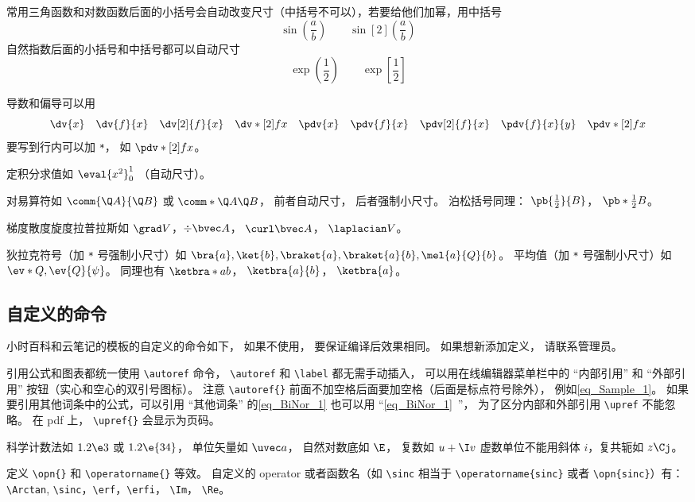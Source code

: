 常用三角函数和对数函数后面的小括号会自动改变尺寸（中括号不可以），若要给他们加幂，用中括号
\begin{equation}
\sin(\frac ab) \qquad \sin[2](\frac ab)
\end{equation}
自然指数后面的小括号和中括号都可以自动尺寸
\begin{equation}
\exp(\frac12) \qquad \exp[\frac12]
\end{equation}

导数和偏导可以用
\begin{equation}
\dv{x} \quad \dv{f}{x} \quad \dv[2]{f}{x} \quad \dv*[2]{f}{x} \quad
\pdv{x} \quad \pdv{f}{x} \quad \pdv[2]{f}{x} \quad \pdv{f}{x}{y} \quad \pdv*[2]{f}{x}
\end{equation}
要写到行内可以加 \verb|*|， 如 $\pdv*[2]{f}{x}$。

定积分求值如 $\eval{x^2}_0^1$ （自动尺寸）。

对易算符如 $\comm{\Q A}{\Q B}$ 或 $\comm*{\Q A}{\Q B}$， 前者自动尺寸， 后者强制小尺寸。 泊松括号同理： $\pb{\frac12}{B}$， $\pb*{\frac12}{B}$。

梯度散度旋度拉普拉斯如 $\grad V$，$\div\bvec A$， $\curl\bvec A$， $\laplacian V$。

狄拉克符号（加 \verb|*| 号强制小尺寸）如 $\bra{a}, \ket{b}, \braket{a}, \braket{a}{b}, \mel{a}{Q}{b}$。 平均值（加 \verb|*| 号强制小尺寸）如 $\ev*{Q}, \ev{Q}{\psi}$。 同理也有 $\ketbra*{a}{b}$， $\ketbra{a}{b}$， $\ketbra{a}$。


\subsection{自定义的命令}
小时百科和云笔记的模板的自定义的命令如下， 如果不使用， 要保证编译后效果相同。 如果想新添加定义， 请联系管理员。

引用公式和图表都统一使用 \verb|\autoref| 命令， \verb|\autoref| 和 \verb|\label| 都无需手动插入， 可以用在线编辑器菜单栏中的 “内部引用” 和 “外部引用” 按钮（实心和空心的双引号图标）。 注意 \verb|\autoref{}| 前面不加空格后面要加空格（后面是标点符号除外）， 例如\autoref{eq_Sample_1}。 如果要引用其他词条中的公式，可以引用 “其他词条” 的\autoref{eq_BiNor_1} 也可以用 “\autoref{eq_BiNor_1}~”， 为了区分内部和外部引用 \verb|\upref| 不能忽略。 在 pdf 上， \verb|\upref{}| 会显示为页码。

科学计数法如 $1.2\e3$ 或 $1.2\e{34}$， 单位矢量如 $\uvec a$， 自然对数底如 $\E$， 复数如 $u+\I v$ 虚数单位不能用斜体 $i$，复共轭如 $z\Cj$。

定义 \verb|\opn{}| 和 \verb|\operatorname{}| 等效。 自定义的 operator 或者函数名（如 \verb|\sinc| 相当于 \verb|\operatorname{sinc}| 或者 \verb|\opn{sinc}|）有： \verb|\Arctan|, \verb|\sinc|，\verb|\erf|，\verb|\erfi|， \verb|\Im|， \verb|\Re|。

